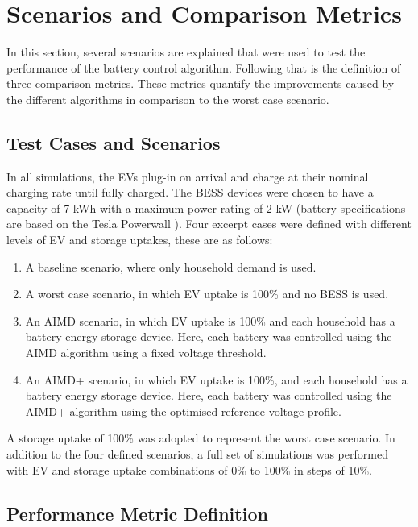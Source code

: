 \section{Scenarios and Comparison Metrics}
\label{ch4:sec:scenarios-and-comparison-metrics}

In this section, several scenarios are explained that were used to test the performance of the battery control algorithm. Following that is the definition of three comparison metrics. These metrics quantify the improvements caused by the different algorithms in comparison to the worst case scenario.

\subsection{Test Cases and Scenarios}
\label{subsec-cases}

In all simulations, the EVs plug-in on arrival and charge at their nominal charging rate until fully charged. The BESS devices were chosen to have a capacity of 7 kWh with a maximum power rating of 2 kW (battery specifications are based on the Tesla Powerwall \cite{Powerwall2015}).
Four excerpt cases were defined with different levels of EV and storage uptakes, these are as follows:
\begin{enumerate}[label=\textbf{\Alph*}, leftmargin=2.2em, labelsep=5.5mm]
\item A baseline scenario, where only household demand is used.
\item A worst case scenario, in which EV uptake is 100\% and no BESS is used.
\item An AIMD scenario, in which EV uptake is 100\% and each household has a battery energy storage device. Here, each battery was controlled using the AIMD algorithm using a fixed voltage threshold.
\item An AIMD+ scenario, in which EV uptake is 100\%, and each household has a battery energy storage device. Here, each battery was controlled using the AIMD+ algorithm using the optimised reference voltage profile.
\end{enumerate}

A storage uptake of 100\% was adopted to represent the worst case scenario. In addition to the four defined scenarios, a full set of simulations was performed with EV and storage uptake combinations of 0\% to 100\% in steps of 10\%.

\subsection{Performance Metric Definition}
\label{subsec-metrics}

